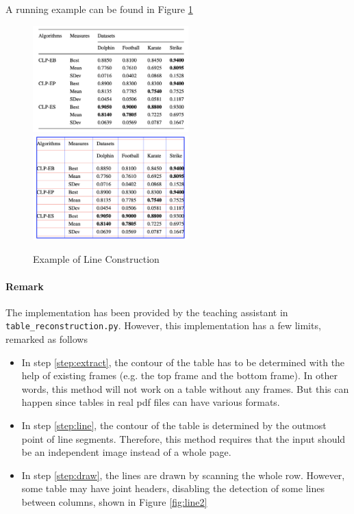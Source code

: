 A running example can be found in Figure \ref{fig:line}

\begin{figure}[ht]
  \begin{center}
  \includegraphics[width=6cm]{img/line_org.png}
  \includegraphics[width=6cm]{img/line.png}
  \caption{Example of Line Construction}
  \label{fig:line}
  \end{center}
\end{figure}

\paragraph{Remark} The implementation has been provided by the teaching assistant in \texttt{table\_reconstruction.py}. However, this implementation has a few limits, remarked as follows

\begin{itemize}
    \item In step \ref{step:extract}, the contour of the table has to be determined with the help of existing frames (e.g. the top frame and the bottom frame). In other words, this method will not work on a table without any frames. But this can happen since tables in real pdf files can have various formats.
    \item In step \ref{step:line}, the contour of the table is determined by the outmost point of line segments. Therefore, this method requires that the input should be an independent image instead of a whole page.
    \item In step \ref{step:draw}, the lines are drawn by scanning the whole row. However, some table may have joint headers, disabling the detection of some lines between columns, shown in Figure \ref{fig:line2}
\end{itemize}


